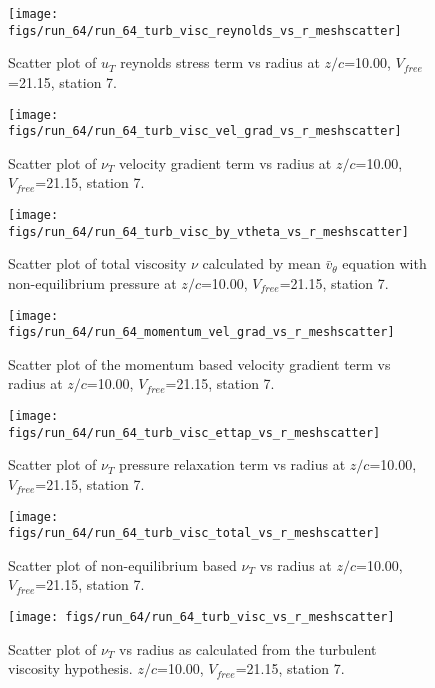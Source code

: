 \begin{figure}[H]
\centering
\texttt{[image: figs/run\_64/run\_64\_turb\_visc\_reynolds\_vs\_r\_meshscatter]}
\caption{Scatter plot of $
u_T$ reynolds stress term vs radius at $z/c$=10.00, $V_{free}$=21.15, station 7.}
\end{figure}


\begin{figure}[H]
\centering
\texttt{[image: figs/run\_64/run\_64\_turb\_visc\_vel\_grad\_vs\_r\_meshscatter]}
\caption{Scatter plot of $\nu_T$ velocity gradient term vs radius at $z/c$=10.00, $V_{free}$=21.15, station 7.}
\end{figure}


\begin{figure}[H]
\centering
\texttt{[image: figs/run\_64/run\_64\_turb\_visc\_by\_vtheta\_vs\_r\_meshscatter]}
\caption{Scatter plot of total viscosity $\nu$ calculated by mean $\bar{v}_{\theta}$ equation with non-equilibrium pressure at $z/c$=10.00, $V_{free}$=21.15, station 7.}
\end{figure}


\begin{figure}[H]
\centering
\texttt{[image: figs/run\_64/run\_64\_momentum\_vel\_grad\_vs\_r\_meshscatter]}
\caption{Scatter plot of the momentum based velocity gradient term vs radius at $z/c$=10.00, $V_{free}$=21.15, station 7.}
\end{figure}


\begin{figure}[H]
\centering
\texttt{[image: figs/run\_64/run\_64\_turb\_visc\_ettap\_vs\_r\_meshscatter]}
\caption{Scatter plot of $\nu_T$ pressure relaxation term vs radius at $z/c$=10.00, $V_{free}$=21.15, station 7.}
\end{figure}


\begin{figure}[H]
\centering
\texttt{[image: figs/run\_64/run\_64\_turb\_visc\_total\_vs\_r\_meshscatter]}
\caption{Scatter plot of non-equilibrium based $\nu_T$ vs radius at $z/c$=10.00, $V_{free}$=21.15, station 7.}
\end{figure}


\begin{figure}[H]
\centering
\texttt{[image: figs/run\_64/run\_64\_turb\_visc\_vs\_r\_meshscatter]}
\caption{Scatter plot of $\nu_T$ vs radius as calculated from the turbulent viscosity hypothesis. $z/c$=10.00, $V_{free}$=21.15, station 7.}
\end{figure}



